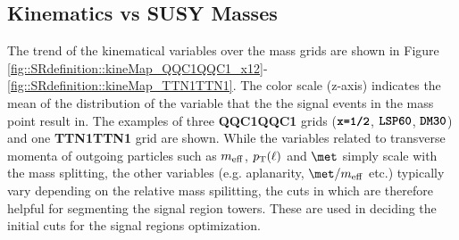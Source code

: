 \subsection{Kinematics vs SUSY Masses} \label{sec::App::kineMap}
The trend of the kinematical variables over the mass grids are shown in Figure \ref{fig::SRdefinition::kineMap_QQC1QQC1_x12}-\ref{fig::SRdefinition::kineMap_TTN1TTN1}. The color scale (z-axis) indicates the mean of the distribution of the variable that the the signal events in the mass point result in. The examples of three \textbf{QQC1QQC1} grids ($\mathrm{\textbf{\texttt{x=1/2}}}$, $\mathrm{\textbf{\texttt{LSP60}}}$, $\mathrm{\textbf{\texttt{DM30}}}$) and one \textbf{TTN1TTN1} grid are shown. 
While the variables related to transverse momenta of outgoing particles such as $m_{\mathrm{eff}}$, $p_{\mathrm{T}}(\ell)$ and $\met$ simply scale with the mass splitting, the other variables (e.g. aplanarity, $\metOverMeff$ etc.) typically vary depending on the relative mass spilitting, the cuts in which are therefore helpful for segmenting the signal region towers.
These are used in deciding the initial cuts for the signal regions optimization. \\


 

